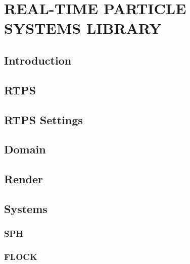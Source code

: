 \chapter{REAL-TIME PARTICLE SYSTEMS LIBRARY}

\section{Introduction}

\section{RTPS}

\section{RTPS Settings}

\section{Domain}

\section{Render}

\section{Systems}

\subsection{SPH}

\subsection{FLOCK}

